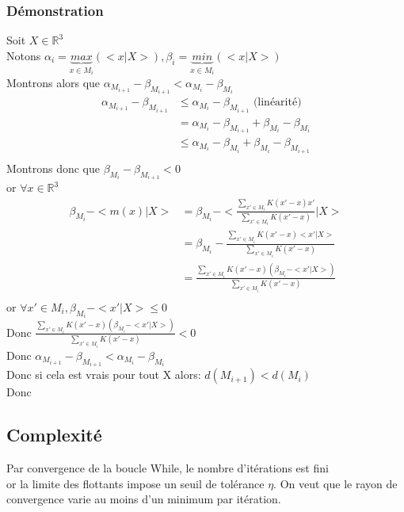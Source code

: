 \documentclass[12pt,a4paper]{article}
\newcommand{\ns}{\\\indent\indent\vspace{0.25cm}}
\newcommand{\R}{\mathbb{R}}
\begin{document}
\subsubsection*{Démonstration}
Soit $X \in \R^3$\\
Notons $\alpha_i = \underbrace{max}_{x \in M_i}(<x|X>) , \beta_i = \underbrace{min}_{x \in M_i}(<x|X>)$\\
Montrons alors que $\alpha_{M_{i+1}} - \beta_{M_{i+1}} < \alpha_{M_i} -\beta_{M_i}$\\
\begin{align*}
\alpha_{M_{i+1}} - \beta_{M_{i+1}} &\leq \alpha_{M_i} - \beta_{M_{i+1}} \text{ (linéarité)}\\
&= \alpha_{M_i} - \beta_{M_{i+1}} + \beta_{M_i} - \beta_{M_i}\\
&\leq \alpha_{M_i}- \beta_{M_i} + \beta_{M_i} - \beta_{M_{i+1}}\\
\end{align*}
Montrons donc que  $\beta_{M_i} - \beta_{M_{i+1}} < 0 $\\
or $\forall x \in \R^3$
\scriptsize
\begin{align*}
\beta_{M_i} - <m(x)|X> &= \beta_{M_i} - <\frac{\sum_{x' \in M_i} K(x' - x)x'}{\sum_{x' \in M_i} K(x' - x)}|X>\\
&= \beta_{M_i} - \frac{\sum_{x' \in M_i} K(x' - x)<x'|X>}{\sum_{x' \in M_i} K(x' - x)}\\
&= \frac{\sum_{x' \in M_i} K(x' - x)(\beta_{M_i} - <x'|X>)}{\sum_{x' \in M_i} K(x' - x)}\\
\end{align*}
\normalsize
or $\forall x' \in M_i, \beta_{M_i} - <x'|X> \leq 0$\\
Donc $\frac{\sum_{x' \in M_i} K(x' - x)(\beta_{M_i} - <x'|X>)}{\sum_{x' \in M_i} K(x' - x)} < 0$\\
Donc $\alpha_{M_{i+1}} - \beta_{M_{i+1}} < \alpha_{M_i} - \beta_{M_i}$\\
Donc si cela est vrais pour tout X alors: $d(M_{i+1}) < d(M_{i})$\\
Donc  
\subsection*{Complexité}

Par convergence de la boucle While, le nombre d'itérations est fini\\
or la limite des flottants impose un seuil de tolérance $\eta$.
On veut que le rayon de convergence varie au moins d'un minimum par itération. \ns
\end{document}
